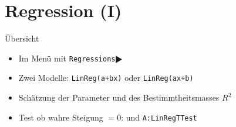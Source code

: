 \documentclass[handout]{beamer}
\newlength{\tikey}
\newcommand{\keystroke}[1]{\settowidth{\tikey}{\scriptsize #1}\psframebox[framearc=0.2]{\parbox{\tikey}{\scriptsize #1}}}
\begin{document}
%
%

\section{Regression (I)}
\begin{frame}{Übersicht}
\begin{itemize}
\item Im Menü \keystroke{F4} mit \texttt{Regressions$\RHD$}
\item Zwei Modelle: \texttt{LinReg(a+bx)} oder \texttt{LinReg(ax+b)}
\item Schätzung der Parameter und des Bestimmtheitsmasses $R^2$
\item Test ob wahre Steigung $= 0$: \keystroke{F6} und \texttt{A:LinRegTTest}
\end{itemize}
\end{frame}
\end{document}
